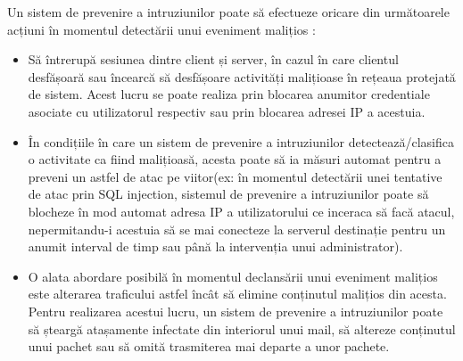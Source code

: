 Un sistem de prevenire a intruziunilor poate să efectueze oricare din următoarele acțiuni în momentul detectării unui eveniment malițios  \cite{ips_fire}:
\begin{itemize}
	\item  Să întrerupă sesiunea dintre client și server, în cazul în care clientul desfășoară sau încearcă să desfășoare activități malițioase în rețeaua protejată de sistem. Acest lucru se poate realiza prin blocarea anumitor credentiale asociate cu utilizatorul respectiv sau prin blocarea adresei IP a acestuia. 
	\item  În condițiile în care un sistem de prevenire a intruziunilor detectează/clasifica o activitate ca fiind malițioasă, acesta poate să ia măsuri automat pentru a preveni un astfel de atac pe viitor(ex: în momentul detectării unei tentative de atac prin SQL injection, sistemul de prevenire a intruziunilor poate să blocheze în mod automat adresa IP a utilizatorului ce inceraca să facă atacul, nepermitandu-i acestuia să se mai conecteze la serverul destinație pentru un anumit interval de timp sau până la intervenția unui administrator). 
	\item  O alata abordare posibilă în momentul declansării unui eveniment malițios este alterarea traficului astfel încât să elimine conținutul malițios din acesta. Pentru realizarea acestui lucru, un sistem de prevenire a intruziunilor poate să șteargă atașamente infectate din interiorul unui mail, să altereze conținutul unui pachet sau să omită trasmiterea mai departe a unor pachete. 
	
\end{itemize}

